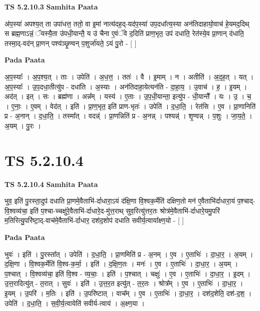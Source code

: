 \documentclass[17pt]{extarticle}
\begin{document}
\textbf{TS 5.2.10.3 } \newline
\textbf{Samhita Paata} \newline

अ॑प॒स्या॑ अपश्य॒त् ता उपा॑धत्त॒ ततो॒ वा इ॒मां नात्य॑दह॒द्-यद॑प॒स्या॑ उप॒दधा᳚त्य॒स्या अन॑तिदाहायो॒वाच॑ हे॒यमद॒दिथ् स ब्रह्म॒णाऽन्नं॒ ॅयस्यै॒ता उ॑पधी॒यान्तै॒ य उ॑ चैना ए॒वंॅवे द॒दिति॑ प्राण॒भृत॒ उप॑ दधाति॒ रेत॑स्ये॒व प्रा॒णान् द॑धाति॒ तस्मा॒द्-वद॑न् प्रा॒णन् पश्य॑ञ्छृ॒ण्वन् प॒शुर्जा॑यते॒ ऽयं पु॒रो - [  ] \newline

\textbf{Pada Paata} \newline

अ॒प॒स्याः᳚ । अ॒प॒श्य॒त् । ताः । उपेति॑ । अ॒ध॒त्त॒ । ततः॑ । वै । इ॒माम् । न । अतीति॑ । अ॒द॒ह॒त् । यत् । अ॒प॒स्याः᳚ । उ॒प॒दधा॒तीत्यु॑प - दधा॑ति । अ॒स्याः । अन॑तिदाहा॒येत्यन॑ति - दा॒हा॒य॒ । उ॒वाच॑ । ह॒ । इ॒यम् । अद॑त् । इत् । सः । ब्रह्म॑णा । अन्न᳚म् । यस्य॑ । ए॒ताः । उ॒प॒धी॒यान्ता॒ इत्यु॑प - धी॒यान्तै᳚ । यः । उ॒ । च॒ । ए॒नाः॒ । ए॒वम् । वेद॑त् । इति॑ । प्रा॒ण॒भृत॒ इति॑ प्राण-भृतः॑ । उपेति॑ । द॒धा॒ति॒ । रेत॑सि । ए॒व । प्रा॒णानिति॑ प्र - अ॒नान् । द॒धा॒ति॒ । तस्मा᳚त् । वदन्न्॑ । प्रा॒णन्निति॑ प्र - अ॒नन्न् । पश्यन्न्॑ । शृ॒ण्वन्न् । प॒शुः । जा॒य॒ते॒ । अ॒यम् । पु॒रः ।  \newline





\section{ TS 5.2.10.4 }

\textbf{TS 5.2.10.4 } \newline
\textbf{Samhita Paata} \newline

भुव॒ इति॑ पु॒रस्ता॒दुप॑ दधाति प्रा॒णमे॒वैताभि॑-र्दाधारा॒ऽयं द॑क्षि॒णा वि॒श्वक॒र्मेति॑ दक्षिण॒तो मन॑ ए॒वैताभि॑र्दाधारा॒यं प॒श्चाद्-वि॒श्वव्य॑चा॒ इति॑ प॒श्चा-च्चक्षु॑रे॒वैताभि॑-र्दाधारे॒द-मु॑त्त॒राथ् सुव॒रित्यु॑त्तर॒तः श्रोत्र॑मे॒वैताभि॑-र्दाधारे॒यमु॒परि॑ म॒तिरित्यु॒परि॑ष्टा॒द्-वाच॑मे॒वैताभि॑-र्दाधार॒ दश॑द॒शोप॑ दधाति सवीर्य॒त्वाया᳚क्ष्ण॒यो - [  ] \newline

\textbf{Pada Paata} \newline

भुवः॑ । इति॑ । पु॒रस्ता᳚त् । उपेति॑ । द॒धा॒ति॒ । प्रा॒णमिति॑ प्र - अ॒नम् । ए॒व । ए॒ताभिः॑ । दा॒धा॒र॒ । अ॒यम् । द॒क्षि॒णा । वि॒श्वक॒र्मेति॑ वि॒श्व-क॒र्मा॒ । इति॑ । द॒क्षि॒ण॒तः । मनः॑ । ए॒व । ए॒ताभिः॑ । दा॒धा॒र॒ । अ॒यम् । प॒श्चात् । वि॒श्वव्य॑चा॒ इति॑ वि॒श्व - व्य॒चाः॒ । इति॑ । प॒श्चात् । चक्षुः॑ । ए॒व । ए॒ताभिः॑ । दा॒धा॒र॒ । इ॒दम् । उ॒त्त॒रादित्यु॑त् - त॒रात् । सुवः॑ । इति॑ । उ॒त्त॒र॒त इत्यु॑त् - त॒र॒तः । श्रोत्र᳚म् । ए॒व । ए॒ताभिः॑ । दा॒धा॒र॒ । इ॒यम् । उ॒परि॑ । म॒तिः । इति॑ । उ॒परि॑ष्टात् । वाच᳚म् । ए॒व । ए॒ताभिः॑ । दा॒धा॒र॒ । दश॑द॒शेति॒ दश॑-द॒श॒ । उपेति॑ । द॒धा॒ति॒ । स॒वी॒र्य॒त्वायेति॑ सवीर्य-त्वाय॑ । अ॒क्ष्ण॒या ।  \newline
\end{document}
